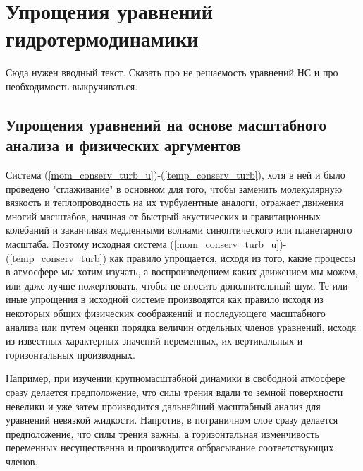 \chapter{{\color{done}Упрощения уравнений гидротермодинамики}}
    \begin{warn}
    Сюда нужен вводный текст. Сказать про не решаемость уравнений НС и про необходимость выкручиваться. 
    \end{warn}

\section{{\color{done}Упрощения уравнений на основе масштабного анализа и физических аргументов}}

Система (\ref{mom_conserv_turb_u})-(\ref{temp_conserv_turb}), хотя в ней и было проведено "сглаживание" в основном для того, чтобы заменить молекулярную вязкость и теплопроводность на их турбулентные аналоги, отражает движения многий масштабов, начиная от быстрый акустических и гравитационных колебаний и заканчивая медленными волнами синоптического или планетарного масштаба. Поэтому исходная система (\ref{mom_conserv_turb_u})-(\ref{temp_conserv_turb}) как правило упрощается, исходя из того, какие процессы в атмосфере мы хотим изучать, а воспроизведением каких движением мы можем, или даже лучше пожертвовать, чтобы не вносить дополнительный шум. Те или иные упрощения в исходной системе производятся как правило исходя из некоторых общих физических соображений и последующего масштабного анализа или путем оценки порядка величин отдельных членов уравнений, исходя из известных характерных значений переменных, их вертикальных и горизонтальных производных.

Например, при изучении крупномасштабной динамики в свободной атмосфере сразу делается предположение, что силы трения вдали то земной поверхности невелики и уже затем производится дальнейший масштабный анализ для уравнений невязкой жидкости. Напротив, в пограничном слое сразу делается предположение, что силы трения важны, а горизонтальная изменчивость переменных несущественна и производится отбрасывание соответствующих членов.

